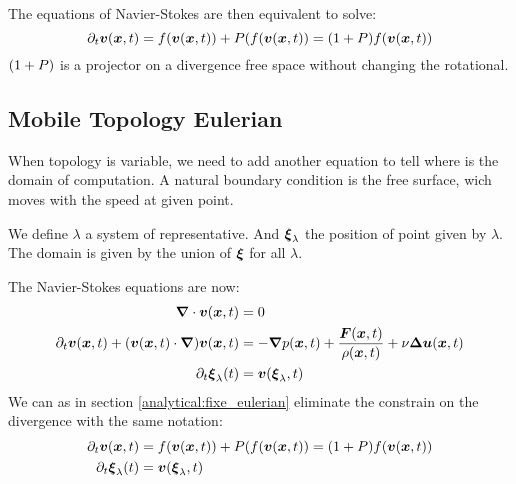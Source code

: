 The equations of Navier-Stokes are then equivalent to solve:
\begin{equation}
  \partial_t {\boldsymbol {v}}({\boldsymbol {x}} ,t)=f({\boldsymbol {v}}({\boldsymbol {x}},t))+P(f({\boldsymbol {v}}({\boldsymbol {x}},t))=(1+P)f({\boldsymbol {v}}({\boldsymbol {x}},t))
\end{equation}
$(1+P)$ is a projector on a divergence free space without changing the rotational.

\subsection{Mobile Topology Eulerian}
When topology is variable, we need to add another equation to tell where is the domain of computation.
A natural boundary condition is the free surface, wich moves with the speed at given point.

We define $\lambda$ a system of representative. And ${\boldsymbol {\xi}}_{\lambda}$ the position of point given by $\lambda$.
The domain is given by the union of ${\boldsymbol {\xi}}$ for all $\lambda$.

The Navier-Stokes equations are now:
\begin{subequations}
\begin{align}
\label{analytical:navierStokesMobA}
{\boldsymbol {\nabla}} \cdot {\boldsymbol {v}}({\boldsymbol {x}} ,t)&=0\\
\label{analytical:navierStokesMobB}
\partial_t {\boldsymbol {v}}({\boldsymbol {x}} ,t)+({\boldsymbol {v}}({\boldsymbol {x}},t)\cdot{\boldsymbol {\nabla}} ) {\boldsymbol {v}}({\boldsymbol {x}} ,t)&=-{\boldsymbol {\nabla}} p({\boldsymbol {x}},t)+\frac{{\boldsymbol {F}}({\boldsymbol {x}},t)}{\rho({\boldsymbol {x}},t)}+\nu {\boldsymbol {\Delta}} {\boldsymbol {u}}({\boldsymbol {x}},t)\\
\partial_t {\boldsymbol {\xi}}_{\lambda}(t)&={\boldsymbol {v}}({\boldsymbol {\xi}}_{\lambda},t)
\end{align}
\end{subequations}
We can as in section \ref{analytical:fixe_eulerian} eliminate the constrain on the divergence with the same notation:
\begin{subequations}
\begin{align}
\partial_t {\boldsymbol {v}}({\boldsymbol {x}} ,t)&=f({\boldsymbol {v}}({\boldsymbol {x}},t))+P(f({\boldsymbol {v}}({\boldsymbol {x}},t))=(1+P)f({\boldsymbol {v}}({\boldsymbol {x}},t))\\
\partial_t {\boldsymbol {\xi}}_{\lambda}(t)&={\boldsymbol {v}}({\boldsymbol {\xi}}_{\lambda},t)\label{ana:move:equ}
\end{align}
\end{subequations}

